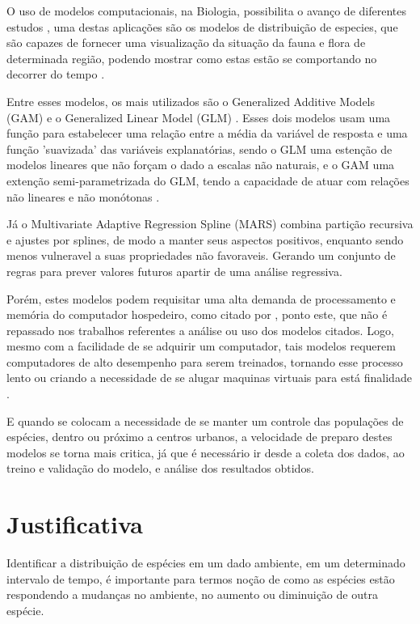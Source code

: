 \documentclass[
	12pt,				%
	openright,			%
	oneside,			%
	a4paper,			%
	english,			%
	brazil				%
	]{abntex2}
\begin{document}
O uso de modelos computacionais, na Biologia, possibilita o avanço de diferentes
estudos \cite{modelagem_comp}, uma destas aplicações são os modelos de distribuição 
de especies, que são capazes de fornecer uma visualização da situação 
da fauna e flora de determinada região, podendo mostrar como estas estão se 
comportando no decorrer do tempo \cite{speciesDistributionModels}.

Entre esses modelos, os mais utilizados são o Generalized Additive Models (GAM) \cite{GAM}
e o Generalized Linear Model (GLM) \cite{GLM}. Esses dois modelos usam uma função para 
estabelecer uma relação entre a média da variável de resposta e uma função 'suavizada'
das variáveis explanatórias, sendo o GLM uma estenção de modelos lineares que não
forçam o dado a escalas não naturais, e o GAM uma extenção semi-parametrizada do GLM,
tendo a capacidade de atuar com relações não lineares e não monótonas \cite{GAMeGLM_especie_estudo}. 

Já o Multivariate Adaptive Regression Spline (MARS) combina partição recursiva e ajustes
por splines, de modo a manter seus aspectos positivos, enquanto sendo menos vulneravel a 
suas propriedades não favoraveis. Gerando um conjunto de regras para prever
valores futuros apartir de uma análise regressiva. \cite{MARS} 

Porém, estes modelos podem requisitar uma alta demanda de processamento e memória do computador hospedeiro, 
como citado por \cite{modelagem_comp}, ponto este, que não é repassado nos trabalhos referentes a análise 
ou uso dos modelos citados. Logo, mesmo com a facilidade de se adquirir um computador, tais modelos
requerem computadores de alto desempenho para serem treinados, tornando esse processo lento ou criando 
a necessidade de se alugar maquinas virtuais para está finalidade \cite{global_cloud_maketing}. 

E quando se colocam a necessidade de se manter um controle das populações de espécies, dentro ou próximo
a centros urbanos, a velocidade de preparo destes modelos se torna mais critica, já que é necessário ir
desde a coleta dos dados, ao treino e validação do modelo, e análise dos resultados obtidos.
 
\section{Justificativa}

Identificar a distribuição de espécies em um dado ambiente, em um determinado intervalo de tempo, 
é importante para termos noção de como as espécies estão respondendo a mudanças no ambiente, no aumento 
ou diminuição de outra espécie.
\end{document}
